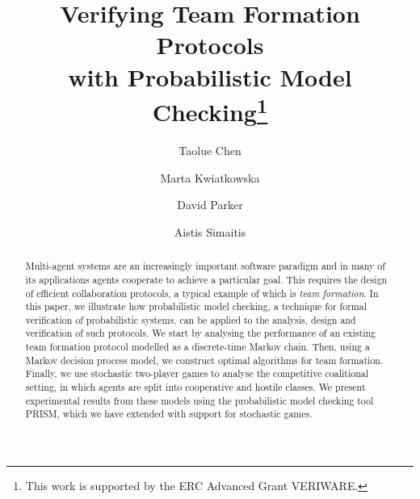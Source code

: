 \documentclass{llncs}
\begin{document}
\title{Verifying Team Formation Protocols \\ with Probabilistic Model Checking\thanks{This work is supported by
the ERC Advanced Grant VERIWARE.}}

\author{Taolue Chen \and Marta Kwiatkowska \and David Parker \and Aistis Simaitis}

\maketitle
\begin{abstract}
Multi-agent systems are an increasingly important software paradigm and in many of
its applications agents cooperate to achieve a particular goal.
This requires the design of efficient collaboration protocols,
a typical example of which is \emph{team formation}.
In this paper, we illustrate how probabilistic model checking,
a technique for formal verification of probabilistic systems,
can be applied to the analysis, design and verification of such protocols.
We start by analysing the performance of an existing team formation protocol
modelled as a discrete-time Markov chain.
Then, using a Markov decision process model,
we construct optimal algorithms for team formation.
Finally, we use stochastic two-player games to analyse the competitive coalitional setting,
in which agents are split into cooperative and hostile classes.
We present experimental results from these models
using the probabilistic model checking tool PRISM,
which we have extended with support for stochastic games.
\end{abstract}
\end{document}
